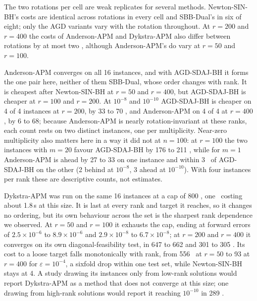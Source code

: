 The two rotations per cell are weak replicates for several methods.
Newton-SIN-BH's costs are identical across rotations in every cell and
SBB-Dual's in six of eight; only the AGD variants vary with the rotation
throughout. At $r=200$ and $r=400$ the costs of Anderson-APM and Dykstra-APM
also differ between rotations by at most two \EVDs, although Anderson-APM's do
vary at $r=50$ and $r=100$.

Anderson-APM converges on all 16 instances, and with AGD-SDAJ-BH it forms the
one pair here, neither of them SBB-Dual, whose order changes with rank. It is
cheapest after Newton-SIN-BH at $r=50$ and $r=400$, but AGD-SDAJ-BH is cheaper
at $r=100$ and $r=200$. At $10^{-8}$ and $10^{-10}$ AGD-SDAJ-BH is cheaper on 4
of 4 instances at $r=200$, by 33 to 70 \EVDs, and Anderson-APM on 4 of 4 at
$r=400$, by 6 to 68; because Anderson-APM is nearly rotation-invariant at these
ranks, each count rests on two distinct instances, one per multiplicity.
Near-zero multiplicity also matters here in a way it did not at $n=100$: at
$r=100$ the two instances with $m=20$ favour AGD-SDAJ-BH by 176 to 211 \EVDs,
while for $m=1$ Anderson-APM is ahead by 27 to 33 on one instance and within
3 \EVDs\ of AGD-SDAJ-BH on the other (2 behind at $10^{-8}$, 3 ahead at
$10^{-10}$). With four instances per rank
these are descriptive counts, not estimates.

Dykstra-APM was run on the same 16 instances at a cap of 800 \EVDs, one \EVD\ costing about 1.8\,s at this size. It is last at every rank and target it
reaches, so it changes no ordering, but its own behaviour across the set is the
sharpest rank dependence we observed. At $r=50$ and $r=100$ it exhausts the cap,
ending at forward errors of $2.5\times10^{-6}$ to $8.9\times10^{-6}$ and
$2.9\times10^{-8}$ to $6.7\times10^{-8}$; at $r=200$
and $r=400$ it converges on its own diagonal-feasibility test, in 647 to 662 and
301 to 305 \EVDs. Its cost to a loose target falls monotonically with rank,
from 556 \EVDs\ at $r=50$ to 93 at $r=400$ for $\varepsilon=10^{-4}$, a sixfold
drop within one test set, while Newton-SIN-BH stays at 4. A study drawing its
instances only from low-rank solutions would report Dykstra-APM as a method that
does not converge at this size; one drawing from high-rank solutions would report
it reaching $10^{-10}$ in 289 \EVDs.

